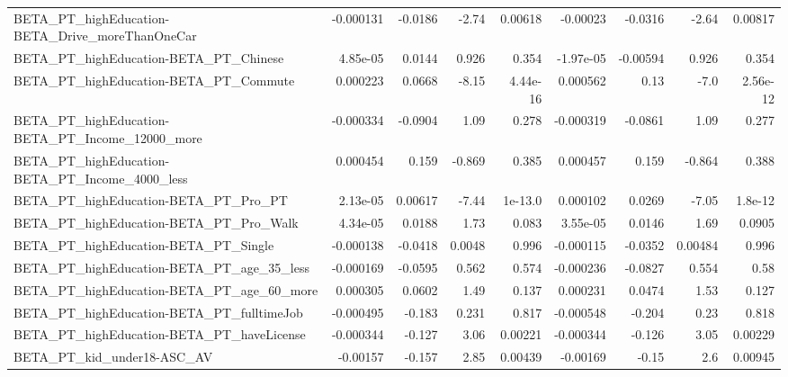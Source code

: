 \begin{tabular}{lrrrrrrrr}
BETA\_PT\_highEducation-BETA\_Drive\_moreThanOneCar    &   -0.000131 &      -0.0186 &     -2.74 &  0.00618 &   -0.00023 &     -0.0316 &        -2.64 &       0.00817 \\
BETA\_PT\_highEducation-BETA\_PT\_Chinese              &    4.85e-05 &       0.0144 &     0.926 &    0.354 &  -1.97e-05 &    -0.00594 &        0.926 &         0.354 \\
BETA\_PT\_highEducation-BETA\_PT\_Commute              &    0.000223 &       0.0668 &     -8.15 & 4.44e-16 &   0.000562 &        0.13 &         -7.0 &      2.56e-12 \\
BETA\_PT\_highEducation-BETA\_PT\_Income\_12000\_more    &   -0.000334 &      -0.0904 &      1.09 &    0.278 &  -0.000319 &     -0.0861 &         1.09 &         0.277 \\
BETA\_PT\_highEducation-BETA\_PT\_Income\_4000\_less     &    0.000454 &        0.159 &    -0.869 &    0.385 &   0.000457 &       0.159 &       -0.864 &         0.388 \\
BETA\_PT\_highEducation-BETA\_PT\_Pro\_PT               &    2.13e-05 &      0.00617 &     -7.44 &  1e-13.0 &   0.000102 &      0.0269 &        -7.05 &       1.8e-12 \\
BETA\_PT\_highEducation-BETA\_PT\_Pro\_Walk             &    4.34e-05 &       0.0188 &      1.73 &    0.083 &   3.55e-05 &      0.0146 &         1.69 &        0.0905 \\
BETA\_PT\_highEducation-BETA\_PT\_Single               &   -0.000138 &      -0.0418 &    0.0048 &    0.996 &  -0.000115 &     -0.0352 &      0.00484 &         0.996 \\
BETA\_PT\_highEducation-BETA\_PT\_age\_35\_less          &   -0.000169 &      -0.0595 &     0.562 &    0.574 &  -0.000236 &     -0.0827 &        0.554 &          0.58 \\
BETA\_PT\_highEducation-BETA\_PT\_age\_60\_more          &    0.000305 &       0.0602 &      1.49 &    0.137 &   0.000231 &      0.0474 &         1.53 &         0.127 \\
BETA\_PT\_highEducation-BETA\_PT\_fulltimeJob          &   -0.000495 &       -0.183 &     0.231 &    0.817 &  -0.000548 &      -0.204 &         0.23 &         0.818 \\
BETA\_PT\_highEducation-BETA\_PT\_haveLicense          &   -0.000344 &       -0.127 &      3.06 &  0.00221 &  -0.000344 &      -0.126 &         3.05 &       0.00229 \\
BETA\_PT\_kid\_under18-ASC\_AV                         &    -0.00157 &       -0.157 &      2.85 &  0.00439 &   -0.00169 &       -0.15 &          2.6 &       0.00945 \\

\end{tabular}
